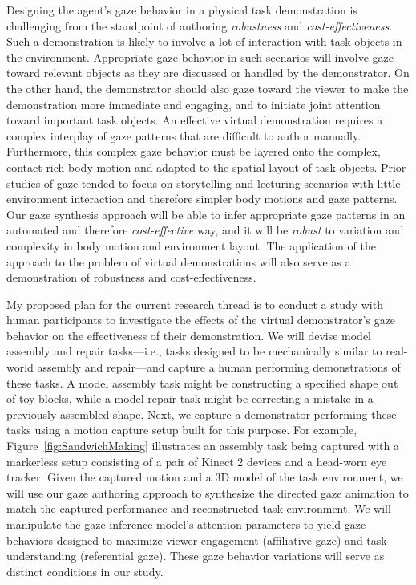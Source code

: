 Designing the agent's gaze behavior in a physical task demonstration is challenging from the standpoint of authoring \emph{robustness} and \emph{cost-effectiveness}. Such a demonstration is likely to involve a lot of interaction with task objects in the environment. Appropriate gaze behavior in such scenarios will involve gaze toward relevant objects as they are discussed or handled by the demonstrator. On the other hand, the demonstrator should also gaze toward the viewer to make the demonstration more immediate and engaging, and to initiate joint attention toward important task objects. An effective virtual demonstration requires a complex interplay of gaze patterns that are difficult to author manually. Furthermore, this complex gaze behavior must be layered onto the complex, contact-rich body motion and adapted to the spatial layout of task objects. Prior studies of gaze tended to focus on storytelling and lecturing scenarios with little environment interaction and therefore simpler body motions and gaze patterns. Our gaze synthesis approach will be able to infer appropriate gaze patterns in an automated and therefore \emph{cost-effective} way, and it will be \emph{robust} to variation and complexity in body motion and environment layout. The application of the approach to the problem of virtual demonstrations will also serve as a demonstration of robustness and cost-effectiveness.

My proposed plan for the current research thread is to conduct a study with human participants to investigate the effects of the virtual demonstrator's gaze behavior on the effectiveness of their demonstration. We will devise model assembly and repair tasks---i.e., tasks designed to be mechanically  similar to real-world assembly and repair---and capture a human performing demonstrations of these tasks. A model assembly task might be constructing a specified shape out of toy blocks, while a model repair task might be correcting a mistake in a previously assembled shape. Next, we capture a demonstrator performing these tasks using a motion capture setup built for this purpose. For example, Figure~\ref{fig:SandwichMaking} illustrates an assembly task being captured with a markerless setup consisting of a pair of Kinect 2 devices and a head-worn eye tracker. Given the captured motion and a 3D model of the task environment, we will use our gaze authoring approach to synthesize the directed gaze animation to match the captured performance and reconstructed task environment. We will manipulate the gaze inference model's attention parameters to yield gaze behaviors designed to maximize viewer engagement (affiliative gaze) and task understanding (referential gaze). These gaze behavior variations will serve as distinct conditions in our study.


